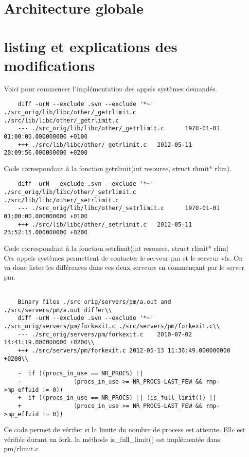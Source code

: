 \documentclass[9pt , a4paper]{article}
\begin{document}
	\section{Architecture globale}
	
	
	\section{listing et explications des modifications}
	
	Voici pour commencer l'implémentation des appels systèmes demandés.\\
	\begin{lstlisting}														 
	diff -urN --exclude .svn --exclude '*~' ./src_orig/lib/libc/other/_getrlimit.c ./src/lib/libc/other/_getrlimit.c
	--- ./src_orig/lib/libc/other/_getrlimit.c      1970-01-01 01:00:00.000000000 +0100
	+++ ./src/lib/libc/other/_getrlimit.c   2012-05-11 20:09:56.000000000 +0200
	\end{lstlisting}
	Code correspondant à la fonction getrlimit(int resource, struct rlimit* rlim). \\ 
	\begin{lstlisting}
	diff -urN --exclude .svn --exclude '*~' ./src_orig/lib/libc/other/_setrlimit.c ./src/lib/libc/other/_setrlimit.c
	--- ./src_orig/lib/libc/other/_setrlimit.c      1970-01-01 01:00:00.000000000 +0100
	+++ ./src/lib/libc/other/_setrlimit.c   2012-05-11 23:52:15.000000000 +0200
	\end{lstlisting}
	Code correspondant à la fonction setrlimit(int resource, struct rlimit* rlim) \\
	Ces appels systèmes permettent de contacter le serveur pm et le serveur vfs. On va donc lister les différences dans ces 	deux serveurs en commençant par le server pm. 
	\\ \\
	\begin{lstlisting}
	Binary files ./src_orig/servers/pm/a.out and ./src/servers/pm/a.out differ\\
	diff -urN --exclude .svn --exclude '*~' ./src_orig/servers/pm/forkexit.c ./src/servers/pm/forkexit.c\\
	--- ./src_orig/servers/pm/forkexit.c    2010-07-02 14:41:19.000000000 +0200\\
	+++ ./src/servers/pm/forkexit.c 2012-05-13 11:36:49.000000000 +0200\\ 
	\end{lstlisting}
	\begin{lstlisting}
	-  if ((procs_in_use == NR_PROCS) || 
	-               (procs_in_use >= NR_PROCS-LAST_FEW && rmp->mp_effuid != 0))
	+  if ((procs_in_use == NR_PROCS) || (is_full_limit()) || 
	+               (procs_in_use >= NR_PROCS-LAST_FEW && rmp->mp_effuid != 0))
    	 \end{lstlisting}

	Ce code permet de vérifier si la limite du nombre de process est atteinte. Elle est vérifiée durant un fork. la méthode is\_full\_limit() est implémentée dans pm/rlimit.c
	
\end{document}
